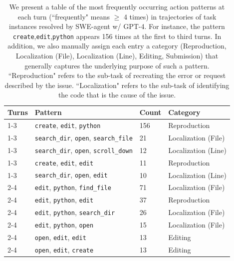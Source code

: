 \begin{table}
    \caption{
We present a table of the most frequently occurring action patterns at each turn (``frequently" means $\geq$ 4 times) in trajectories of task instances resolved by SWE-agent w/ GPT-4.
For instance, the pattern \texttt{create},\texttt{edit},\texttt{python} appears 156 times at the first to third turns.
In addition, we also manually assign each entry a category (Reproduction, Localization (File), Localization (Line), Editing, Submission) that generally captures the underlying purpose of such a pattern.
``Reproduction" refers to the sub-task of recreating the error or request described by the issue.
``Localization" refers to the sub-task of identifying the code that is the cause of the issue.
}
    \label{tab:most_common_triples_by_index}
    \vspace{0.25em}
    \centering
    \begin{tabular}{llll}
\toprule
Turns & Pattern & Count & Category \\
\midrule
1-3 & \texttt{create}, \texttt{edit}, \texttt{python} & 156 & Reproduction \\
1-3 & \texttt{search\_dir}, \texttt{open}, \texttt{search\_file} & 21 & Localization (File) \\
1-3 & \texttt{search\_dir}, \texttt{open}, \texttt{scroll\_down} & 12 & Localization (Line) \\
1-3 & \texttt{create}, \texttt{edit}, \texttt{edit} & 11 & Reproduction \\
1-3 & \texttt{search\_dir}, \texttt{open}, \texttt{edit} & 10 & Localization (Line) \\
2-4 & \texttt{edit}, \texttt{python}, \texttt{find\_file} & 71 & Localization (File) \\
2-4 & \texttt{edit}, \texttt{python}, \texttt{edit} & 37 & Reproduction \\
2-4 & \texttt{edit}, \texttt{python}, \texttt{search\_dir} & 26 & Localization (File) \\
2-4 & \texttt{edit}, \texttt{python}, \texttt{open} & 15 & Localization (File) \\
2-4 & \texttt{open}, \texttt{edit}, \texttt{edit} & 13 & Editing \\
2-4 & \texttt{open}, \texttt{edit}, \texttt{create} & 13 & Editing \\

\end{tabular}
\end{table}
